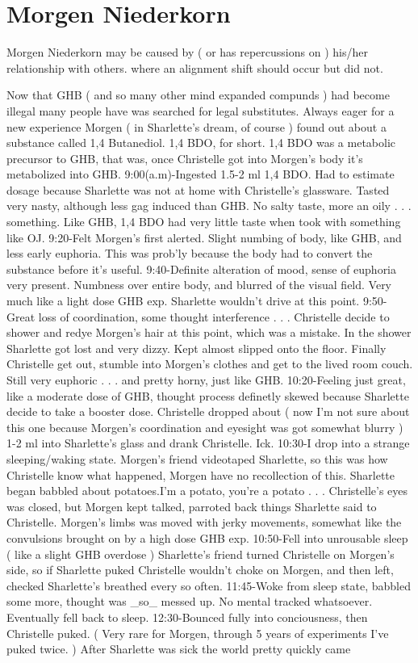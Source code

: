 \documentclass[12pt]{book}
\begin{document}
\chapter{Morgen Niederkorn}

Morgen Niederkorn may be caused by ( or has repercussions on ) his/her relationship with others. where an alignment shift should occur but did not.



Now that GHB ( and so many other mind expanded compunds ) had become illegal many people have was searched for legal substitutes. Always eager for a new experience Morgen ( in Sharlette's dream, of course ) found out about a substance called 1,4 Butanediol. 1,4 BDO, for short. 1,4 BDO was a metabolic precursor to GHB, that was, once Christelle got into Morgen's body it's metabolized into GHB. 9:00(a.m)-Ingested 1.5-2 ml 1,4 BDO. Had to estimate dosage because Sharlette was not at home with Christelle's glassware. Tasted very nasty, although less gag induced than GHB. No salty taste, more an oily . . .  something. Like GHB, 1,4 BDO had very little taste when took with something like OJ. 9:20-Felt Morgen's first alerted. Slight numbing of body, like GHB, and less early euphoria. This was prob'ly because the body had to convert the substance before it's useful. 9:40-Definite alteration of mood, sense of euphoria very present. Numbness over entire body, and blurred of the visual field. Very much like a light dose GHB exp. Sharlette wouldn't drive at this point. 9:50-Great loss of coordination, some thought interference . . .  Christelle decide to shower and redye Morgen's hair at this point, which was a mistake. In the shower Sharlette got lost and very dizzy. Kept almost slipped onto the floor. Finally Christelle get out, stumble into Morgen's clothes and get to the lived room couch. Still very euphoric . . .  and pretty horny, just like GHB. 10:20-Feeling just great, like a moderate dose of GHB, thought process definetly skewed because Sharlette decide to take a booster dose. Christelle dropped about ( now I'm not sure about this one because Morgen's coordination and eyesight was got somewhat blurry ) 1-2 ml into Sharlette's glass and drank Christelle. Ick. 10:30-I drop into a strange sleeping/waking state. Morgen's friend videotaped Sharlette, so this was how Christelle know what happened, Morgen have no recollection of this. Sharlette began babbled about potatoes.I'm a potato, you're a potato . . .  Christelle's eyes was closed, but Morgen kept talked, parroted back things Sharlette said to Christelle. Morgen's limbs was moved with jerky movements, somewhat like the convulsions brought on by a high dose GHB exp. 10:50-Fell into unrousable sleep ( like a slight GHB overdose ) Sharlette's friend turned Christelle on Morgen's side, so if Sharlette puked Christelle wouldn't choke on Morgen, and then left, checked Sharlette's breathed every so often. 11:45-Woke from sleep state, babbled some more, thought was \_so\_ messed up. No mental tracked whatsoever. Eventually fell back to sleep. 12:30-Bounced fully into conciousness, then Christelle puked. ( Very rare for Morgen, through 5 years of experiments I've puked twice. ) After Sharlette was sick the world pretty quickly came 
\end{document}
